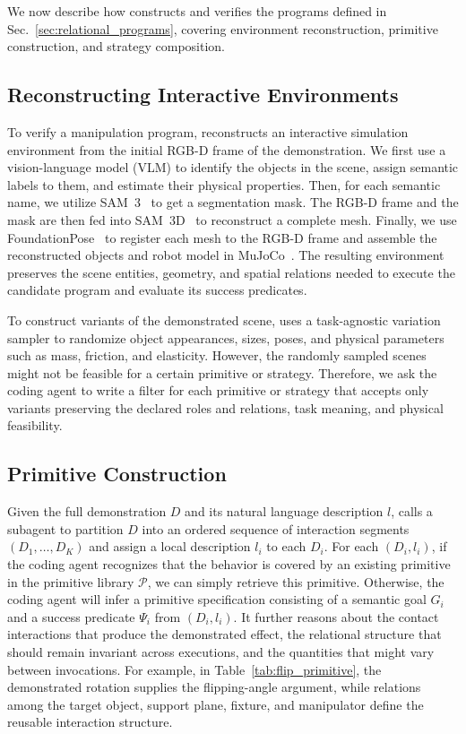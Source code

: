 We now describe how \ours constructs and verifies the programs defined in Sec.~\ref{sec:relational_programs}, covering environment reconstruction, primitive construction, and strategy composition.

\subsection{Reconstructing Interactive Environments}
\label{sec:loop_ingredients}

To verify a manipulation program, \ours reconstructs an interactive simulation environment from the initial RGB-D frame of the demonstration. We first use a vision-language model (VLM) to identify the objects in the scene, assign semantic labels to them, and estimate their physical properties. Then, for each semantic name, we utilize SAM~3~\cite{carion2026sam} to get a segmentation mask. The RGB-D frame and the mask are then fed into SAM~3D~\cite{chen2026sam} to reconstruct a complete mesh. Finally, we use FoundationPose~\cite{wen2024foundationpose} to register each mesh to the RGB-D frame and assemble the reconstructed objects and robot model in MuJoCo~\cite{todorov2012mujoco}. The resulting environment preserves the scene entities, geometry, and spatial relations needed to execute the candidate program and evaluate its success predicates.

To construct variants of the demonstrated scene, \ours uses a task-agnostic variation sampler to randomize object appearances, sizes, poses, and physical parameters such as mass, friction, and elasticity. However, the randomly sampled scenes might not be feasible for a certain primitive or strategy. Therefore, we ask the coding agent to write a filter for each primitive or strategy that accepts only variants preserving the declared roles and relations, task meaning, and physical feasibility.

\subsection{Primitive Construction}
\label{sec:primitive_construction}
Given the full demonstration $D$ and its natural language description $l$, \ours calls a subagent to partition $D$ into an ordered sequence of interaction segments $(D_1,\ldots,D_K)$ and assign a local description $l_i$ to each $D_i$. For each $(D_i,l_i)$, if the coding agent recognizes that the behavior is covered by an existing primitive in the primitive library $\mathcal{P}$, we can simply retrieve this primitive. Otherwise, the coding agent will infer a primitive specification consisting of a semantic goal $G_i$ and a success predicate $\Psi_i$ from $(D_i,l_i)$. It further reasons about the contact interactions that produce the demonstrated effect, the relational structure that should remain invariant across executions, and the quantities that might vary between invocations. For example, in Table~\ref{tab:flip_primitive}, the demonstrated rotation supplies the flipping-angle argument, while relations among the target object, support plane, fixture, and manipulator define the reusable interaction structure.

